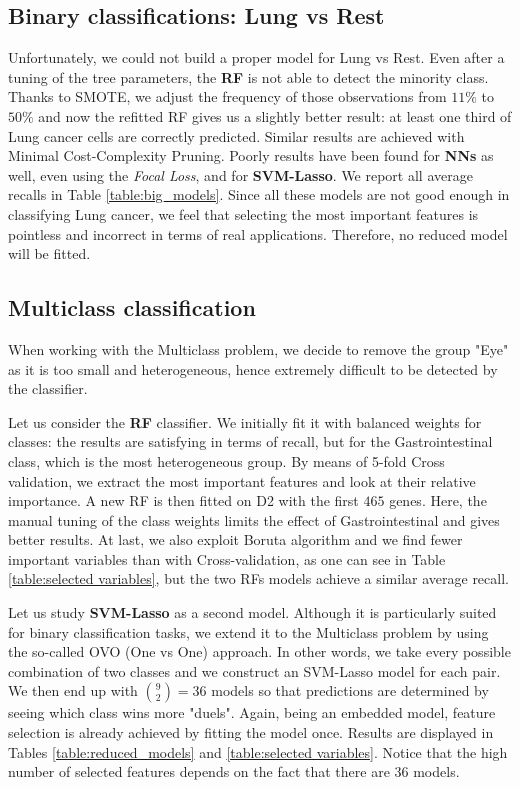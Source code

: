\documentclass[a4paper,11pt, oneside]{article}  %
\begin{document}
\subsection{Binary classifications: Lung vs Rest}
Unfortunately,  we could not build a proper model for Lung vs Rest.  Even after a tuning of the tree parameters,  the \textbf{RF} is not able to detect the minority class.  Thanks to SMOTE, we adjust the frequency of those observations from $11\%$ to $50\%$ and now the refitted RF gives us a slightly better result: at least one third of Lung cancer cells are correctly predicted.  Similar results are achieved with Minimal Cost-Complexity Pruning. Poorly results have been found for \textbf{NNs} as well,  even using the \textit{Focal Loss}, and for \textbf{SVM-Lasso}. We report all average recalls in Table \ref{table:big_models}. Since all these models are not good enough in classifying Lung cancer, we feel that selecting the most important features is pointless and incorrect in terms of real applications. Therefore, no reduced model will be fitted.

\subsection{Multiclass classification}
When working with the Multiclass problem, we decide to remove the group "Eye" as it is too small and heterogeneous, hence extremely difficult to be detected by the classifier. 

Let us consider the \textbf{RF} classifier. We initially fit it with balanced weights for classes: the results are satisfying in terms of recall, but for the Gastrointestinal class, which is the most heterogeneous group. By means of 5-fold Cross validation, we extract the most important features and look at their relative importance. A new RF is then fitted on D2 with the first $465$ genes. Here, the manual tuning of the class weights limits the effect of Gastrointestinal and gives better results.  At last, we also exploit Boruta algorithm and we find fewer important variables than with Cross-validation,  as one can see in Table \ref{table:selected variables},  but the two RFs models achieve a similar average recall.

Let us study \textbf{SVM-Lasso} as a second model.  Although it is particularly suited for binary classification tasks, we extend it to the Multiclass problem by using the so-called OVO (One vs One) approach. In other words, we take every possible combination of two classes and we construct an SVM-Lasso model for each pair. We then end up with $ \binom{9}{2} = 36$ models so that predictions are determined by seeing which class wins more "duels". Again,  being an embedded model, feature selection is already achieved by fitting the model once.  Results are displayed in Tables \ref{table:reduced_models} and \ref{table:selected variables}. Notice that the high number of selected features depends on the fact that there are 36 models.  
\end{document}

